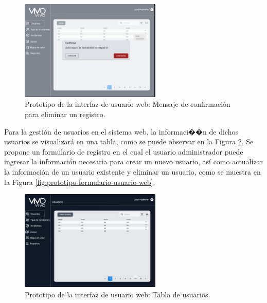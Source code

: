 \begin{figure}[H]
    \centering
    \includegraphics[width=0.6\textwidth]{chapters/III-resultados-y-discusion/resources/images/prototipo-mensaje-eliminar-web.png}
    \caption{Prototipo de la interfaz de usuario web: Mensaje de confirmación para eliminar un registro.}
    \label{fig:prototipo-mensaje-eliminar-web}
\end{figure}

Para la gestión de usuarios en el sistema web, la informaci��n de dichos usuarios se visualizará en una tabla, como se puede observar en la Figura
\ref{fig:prototipo-tabla-usuarios-web}. Se propone un formulario de registro en el cual el usuario administrador puede ingresar la información
necesaria para crear un nuevo usuario, así como actualizar la información de un usuario existente y eliminar un usuario, como se muestra en la Figura
\ref{fig:prototipo-formulario-usuario-web}.

\begin{figure}[H]
    \centering
    \includegraphics[width=0.6\textwidth]{chapters/III-resultados-y-discusion/resources/images/prototipo-tabla-usuarios-web.png}
    \caption{Prototipo de la interfaz de usuario web: Tabla de usuarios.}
    \label{fig:prototipo-tabla-usuarios-web}
\end{figure}

